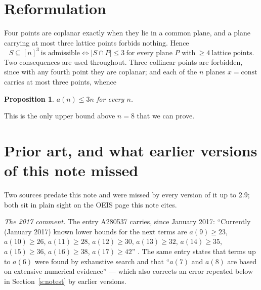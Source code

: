 \documentclass[11pt,a4paper]{article}
\newtheorem{proposition}{Proposition}
\begin{document}
\section{Reformulation}
Four points are coplanar exactly when they lie in a common plane, and a plane carrying at most
three lattice points forbids nothing.  Hence
\[S\subseteq[n]^3\ \text{is admissible}\iff |S\cap P|\le3\ \text{for every plane }P\text{ with}\ \ge4\ \text{lattice points.}\]
Two consequences are used throughout.  Three collinear points are forbidden, since with any
fourth point they are coplanar; and each of the $n$ planes $x=\text{const}$ carries at most
three points, whence
\begin{proposition}\label{p:3n}
$a(n)\le 3n$ for every $n$.
\end{proposition}
This is the only upper bound above $n=8$ that we can prove.

\section{Prior art, and what earlier versions of this note missed}\label{s:prior}
Two sources predate this note and were missed by every version of it up to 2.9; both sit in
plain sight on the OEIS page this note cites.

\emph{The 2017 comment.}  The entry A280537 carries, since January 2017: ``Currently (January
2017) known lower bounds for the next terms are $a(9)\ge23$, $a(10)\ge26$, $a(11)\ge28$,
$a(12)\ge30$, $a(13)\ge32$, $a(14)\ge35$, $a(15)\ge36$, $a(16)\ge38$, $a(17)\ge42$''
\cite{OEISA280537}.  The same entry states that terms up to $a(6)$ were found by exhaustive
search and that ``$a(7)$ and $a(8)$ are based on extensive numerical evidence'' --- which also
corrects an error repeated below in Section~\ref{s:notest} by earlier versions.
\end{document}
